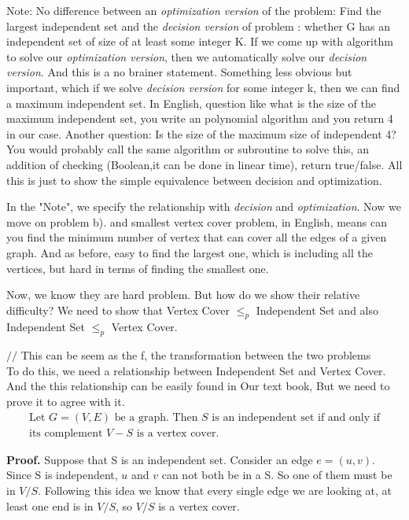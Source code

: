\documentclass{article}
\begin{document}
Note: No difference between an \textit{optimization version} of the problem: Find the largest independent set and the \textit{decision version} of problem : whether G has an independent set of size of at least some integer K. If we come up with algorithm to solve our \textit{optimization version}, then we automatically solve our \textit{decision version}. And this is a no brainer statement. Something less obvious but important, which if we solve \textit{decision version} for some integer k, then we can find a maximum independent set. In English, question like what is the size of the maximum independent set, you write an polynomial algorithm and you return 4 in our case. Another question: Is the size of the maximum size of independent 4? You would probably call the same algorithm or subroutine to solve this, an addition of checking (Boolean,it can be done in linear time), return true/false. All this is just to show the simple equivalence between decision and optimization. 

In the "Note", we specify the relationship with \textit{decision} and \textit{optimization}. Now we move on problem b). and smallest vertex cover problem, in English, means can you find the minimum number of vertex that can cover all the edges of a given graph. And as before, easy to find the largest one, which is including all the vertices, but hard in terms of finding the smallest one. 

Now, we know they are hard problem. But how do we show their relative difficulty? We need to show that Vertex Cover $\leq_{p}$ Independent Set and also Independent Set $\leq_{p}$ Vertex Cover. 

$//$ This can be seem as the f, the transformation between the two problems\\
To do this, we need a relationship between Independent Set and Vertex Cover. And the this relationship can be easily found in Our text book, But we need to prove it to agree with it. 
\begin{equation}
\begin{array}{l}{\text {Let } G=(V, E) \text { be a graph. Then } S \text { is an independent set if and only if}} \\ {\text {its complement } V-S \text { is a vertex cover. }}\end{array}
\end{equation}

\textbf{Proof.} Suppose that S is an independent set. Consider an edge $e=(u,v)$. Since S is independent, $u$ and $v$ can not both be in a S. So one of them must be in $V/S$. Following this idea we know that every single edge we are looking at, at least one end is in $V/S$, so $V/S$ is a vertex cover. 
\end{document}

